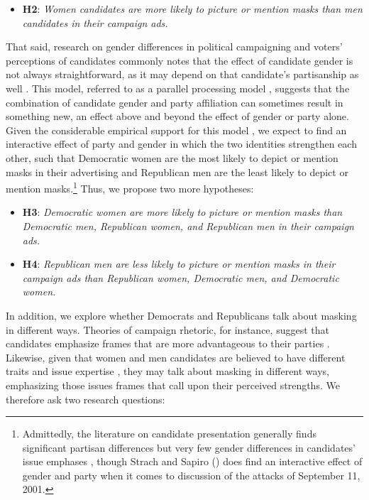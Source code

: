 \begin{itemize}
\item[]
\textbf{H2}: \textit{Women candidates are more likely to picture or mention masks than men candidates in their campaign ads.}
\end{itemize}

That said, research on gender differences in political campaigning and voters' perceptions of candidates commonly notes that the effect of candidate gender is not always straightforward, as it may depend on that candidate's partisanship as well \parencite{king2003sex, huddy2002gender}. This model, referred to as a parallel processing model \parencite{schneider2016interplay}, suggests that the combination of candidate gender and party affiliation can sometimes result in something new, an effect above and beyond the effect of gender or party alone. Given the considerable empirical support for this model \parencite{schneider2016interplay}, we 
expect to find an interactive effect of party and gender in which the two identities strengthen each other, such that Democratic women are the most likely to depict or mention masks in their advertising and Republican men are the least likely to depict or mention masks.\footnote{Admittedly, the literature on candidate presentation generally finds significant partisan differences but very few gender differences in candidates' issue emphases \parencite{dolan2017candidates, sapiro2011gender}, though Strach and Sapiro (\citeyear{strach2011campaigning}) does find an interactive effect of gender and party when it comes to discussion of the attacks of September 11, 2001.}  Thus, we propose two more hypotheses:

\begin{itemize}
\item[]
\textbf{H3}: \textit{Democratic women are more likely to picture or mention masks than Democratic men, Republican women, and Republican men in their campaign ads.}

\item[]
\textbf{H4}: \textit{Republican men are less likely to picture or mention masks in their campaign ads than Republican women, Democratic men, and Democratic women.}
\end{itemize}

In addition, we explore whether Democrats and Republicans talk about masking in different ways.  Theories of campaign rhetoric, for instance, suggest that candidates emphasize frames that are more advantageous to their parties \parencite{sides2006origins}. Likewise, given that women and men candidates are believed to have different traits and issue expertise \parencite{huddy1993gender}, they may talk about masking in different ways, emphasizing those issues frames that call upon their perceived strengths. We therefore ask two research questions:

